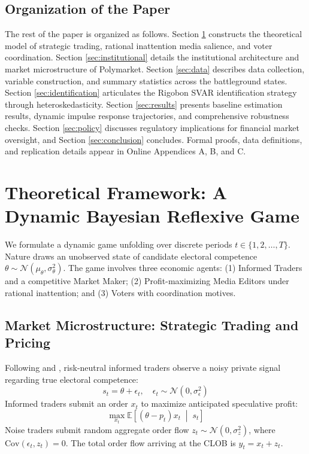 \documentclass[12pt, a4paper]{article}
\begin{document}
\subsection{Organization of the Paper}
The rest of the paper is organized as follows. Section \ref{sec:theory} constructs the theoretical model of strategic trading, rational inattention media salience, and voter coordination. Section \ref{sec:institutional} details the institutional architecture and market microstructure of Polymarket. Section \ref{sec:data} describes data collection, variable construction, and summary statistics across the battleground states. Section \ref{sec:identification} articulates the Rigobon SVAR identification strategy through heteroskedasticity. Section \ref{sec:results} presents baseline estimation results, dynamic impulse response trajectories, and comprehensive robustness checks. Section \ref{sec:policy} discusses regulatory implications for financial market oversight, and Section \ref{sec:conclusion} concludes. Formal proofs, data definitions, and replication details appear in Online Appendices A, B, and C.

\section{Theoretical Framework: A Dynamic Bayesian Reflexive Game}
\label{sec:theory}

We formulate a dynamic game unfolding over discrete periods $t \in \{1, 2, \dots, T\}$. Nature draws an unobserved state of candidate electoral competence $\theta \sim \mathcal{N}(\mu_\theta, \sigma_\theta^2)$. The game involves three economic agents: (1) Informed Traders and a competitive Market Maker; (2) Profit-maximizing Media Editors under rational inattention; and (3) Voters with coordination motives.

\subsection{Market Microstructure: Strategic Trading and Pricing}
Following \citet{Kyle1985} and \citet{GlostenMilgrom1985}, risk-neutral informed traders observe a noisy private signal regarding true electoral competence:
\begin{equation}
s_t = \theta + \epsilon_t, \quad \epsilon_t \sim \mathcal{N}(0, \sigma_\epsilon^2)
\end{equation}
Informed traders submit an order $x_t$ to maximize anticipated speculative profit:
\begin{equation}
\max_{x_t} \mathbb{E}\left[ (\theta - p_t) x_t \;\middle|\; s_t \right]
\end{equation}
Noise traders submit random aggregate order flow $z_t \sim \mathcal{N}(0, \sigma_z^2)$, where $\text{Cov}(\epsilon_t, z_t) = 0$. The total order flow arriving at the CLOB is $y_t = x_t + z_t$.
\end{document}
